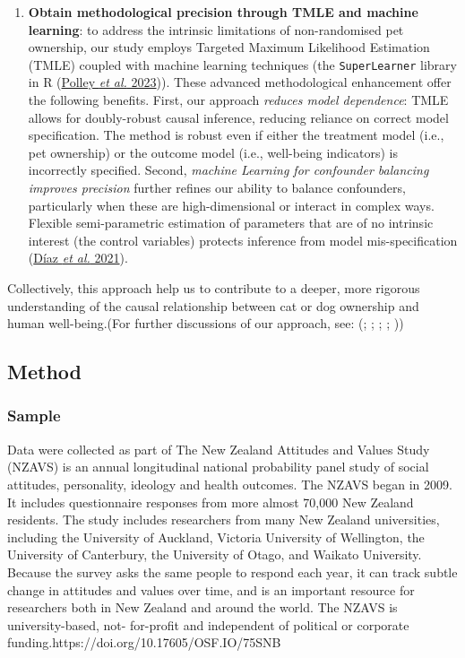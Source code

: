 \documentclass[
  singlecolumn,
  9pt]{article}
\begin{document}
\begin{enumerate}
\item
  \textbf{Obtain methodological precision through TMLE and machine
  learning}: to address the intrinsic limitations of non-randomised pet
  ownership, our study employs Targeted Maximum Likelihood Estimation
  (TMLE) coupled with machine learning techniques (the
  \texttt{SuperLearner} library in R (\hyperref[ref-polley2023]{Polley
  \emph{et al.} 2023})). These advanced methodological enhancement offer
  the following benefits. First, our approach \emph{reduces model
  dependence}: TMLE allows for doubly-robust causal inference, reducing
  reliance on correct model specification. The method is robust even if
  either the treatment model (i.e., pet ownership) or the outcome model
  (i.e., well-being indicators) is incorrectly specified. Second,
  \emph{machine Learning for confounder balancing improves precision}
  further refines our ability to balance confounders, particularly when
  these are high-dimensional or interact in complex ways. Flexible
  semi-parametric estimation of parameters that are of no intrinsic
  interest (the control variables) protects inference from model
  mis-specification (\hyperref[ref-duxedaz2021]{Díaz \emph{et al.}
  2021}).
\end{enumerate}

Collectively, this approach help us to contribute to a deeper, more
rigorous understanding of the causal relationship between cat or dog
ownership and human well-being.(For further discussions of our approach,
see: (;
;
;
;
))

\subsection{Method}\label{method}

\subsubsection{Sample}\label{sample}

Data were collected as part of The New Zealand Attitudes and Values
Study (NZAVS) is an annual longitudinal national probability panel study
of social attitudes, personality, ideology and health outcomes. The
NZAVS began in 2009. It includes questionnaire responses from more
almost 70,000 New Zealand residents. The study includes researchers from
many New Zealand universities, including the University of Auckland,
Victoria University of Wellington, the University of Canterbury, the
University of Otago, and Waikato University. Because the survey asks the
same people to respond each year, it can track subtle change in
attitudes and values over time, and is an important resource for
researchers both in New Zealand and around the world. The NZAVS is
university-based, not- for-profit and independent of political or
corporate funding.https://doi.org/10.17605/OSF.IO/75SNB
\end{document}
